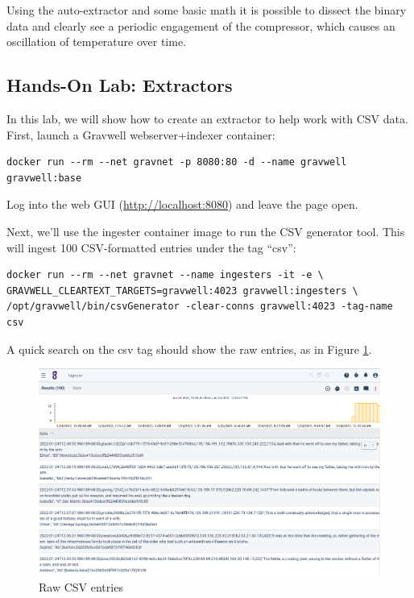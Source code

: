 Using the auto-extractor and some basic math it is possible to dissect
the binary data and clearly see a periodic engagement of the compressor,
which causes an oscillation of temperature over time.

\clearpage
\subsection{Hands-On Lab: Extractors}

In this lab, we will show how to create an extractor to help work with
CSV data. First, launch a Gravwell webserver+indexer container:

\begin{Verbatim}[breaklines=true]
docker run --rm --net gravnet -p 8080:80 -d --name gravwell gravwell:base
\end{Verbatim}

Log into the web GUI (\href{http://localhost:8080}{http://localhost:8080}) and leave the page open.

Next, we'll use the ingester container image to run the CSV generator
tool. This will ingest 100 CSV-formatted entries under the tag ``csv'':

\begin{Verbatim}[breaklines=true]
docker run --rm --net gravnet --name ingesters -it -e \
GRAVWELL_CLEARTEXT_TARGETS=gravwell:4023 gravwell:ingesters \
/opt/gravwell/bin/csvGenerator -clear-conns gravwell:4023 -tag-name csv
\end{Verbatim}

A quick search on the csv tag should show the raw entries, as in Figure \ref{fig:lab-csv-raw}.

\code{tag=csv}

\begin{figure}
	\includegraphics[width=0.7\linewidth]{images/lab-csv-raw.png}
	\caption{Raw CSV entries}
	\label{fig:lab-csv-raw}
\end{figure}

